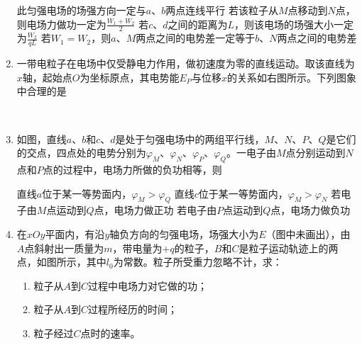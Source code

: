 \begin{enumerate}[leftmargin=0em]
\fourchoices
{此匀强电场的场强方向一定与$ a $、$ b $两点连线平行}
{若该粒子从$ M $点移动到$ N $点，则电场力做功一定为$\frac { W _ { 1 } + W _ { 2 } } { 2 }$}
{若$ c $、$ d $之间的距离为$ L $，则该电场的场强大小一定为$\frac { W _ { 2 } } { q L }$}
{若$ W_1=W_2 $，则$ a $、$ M $两点之间的电势差一定等于$ b $、$ N $两点之间的电势差}





\item
{}
一带电粒子在电场中仅受静电力作用，做初速度为零的直线运动。取该直线为$ x $轴，起始点$ O $为坐标原点，其电势能$ E_{P} $与位移$ x $的关系如右图所示。下列图象中合理的是  
\begin{figure}[h!]
\centering
\\

\end{figure}



\item
{}
如图，直线$ a $、$ b $和$ c $、$ d $是处于匀强电场中的两组平行线，$ M $、$ N $、$ P $、$ Q $是它们的交点，四点处的电势分别为$ \varphi _M $、$ \varphi _N $、$ \varphi _P $、$ \varphi _Q $。一电子由$ M $点分别运动到$ N $点和$ P $点的过程中，电场力所做的负功相等，则  
\begin{figure}[h!]
\centering

\end{figure}


\fourchoices
{直线$ a $位于某一等势面内，$ \varphi _M > \varphi _Q $}
{直线$ c $位于某一等势面内，$ \varphi _M > \varphi _N $ }
{若电子由$ M $点运动到$ Q $点，电场力做正功}
{若电子由$ P $点运动到$ Q $点，电场力做负功}





\item
{}
在$ xOy $平面内，有沿$ y $轴负方向的匀强电场，场强大小为$ E $（图中未画出），由$ A $点斜射出一质量为$ m $，带电量为$ +q $的粒子，$ B $和$ C $是粒子运动轨迹上的两点，如图所示，其中$ l_{0} $为常数。粒子所受重力忽略不计，求：
\begin{enumerate}
\renewcommand{\labelenumi}{\arabic{enumi}.}
\item
粒子从$ A $到$ C $过程中电场力对它做的功；
\item 
粒子从$ A $到$ C $过程所经历的时间；
\item 
粒子经过$ C $点时的速率。




\end{enumerate}
\end{enumerate}
